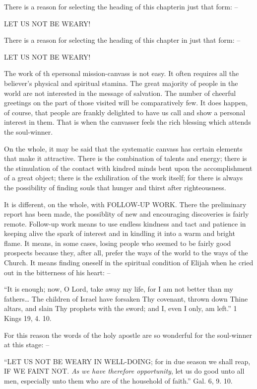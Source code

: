 \documentclass[
]{book}
\begin{document}
There is a reason for selecting the heading of this chapterin just that form: --

LET US NOT BE WEARY!

There is a reason for selecting the heading of this chapter in just that form: --

LET US NOT BE WEARY!

The work of th epersonal mission-canvass is not easy. It often requires all the believer's physical and spiritual stamina. The great majority of people in the world are not interested in the message of salvation. The number of cheerful greetings on the part of those visited will be comparatively few. It does happen, of course, that people are frankly delighted to have us call and show a personal interest in them. That is when the canvasser feels the rich blessing which attends the soul-winner.

On the whole, it may be said that the systematic canvass has certain elements that make it attractive. There is the combination of talents and energy; there is the stimulation of the contact with kindred minds bent upon the accomplishment of a great object; there is the exhiliration of the work itself; for there is always the possibility of finding souls that hunger and thirst after righteousness.

It is different, on the whole, with FOLLOW-UP WORK. There the preliminary report has been made, the possiblity of new and encouraging discoveries is fairly remote. Follow-up work means to use endless kindness and tact and patience in keeping alive the spark of interest and in kindling it into a warm and bright flame. It means, in some cases, losing people who seemed to be fairly good prospects because they, after all, prefer the ways of the world to the ways of the Church. It means finding oneself in the spiritual condition of Elijah when he cried out in the bitterness of his heart: --

``It is enough; now, O Lord, take away my life, for I am not better than my fathers\ldots{} The children of Israel have forsaken Thy covenant, thrown down Thine altars, and slain Thy prophets with the sword; and I, even I only, am left.'' 1 Kings 19, 4. 10.

For this reason the words of the holy apostle are so wonderful for the soul-winner at this stage: --

``LET US NOT BE WEARY IN WELL-DOING; for in due season we shall reap, IF WE FAINT NOT. \emph{As we have therefore opportunity}, let us do good unto all men, especially unto them who are of the household of faith.'' Gal. 6, 9. 10.
\end{document}
